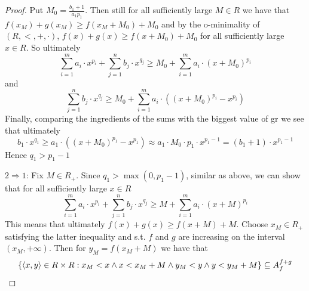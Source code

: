 \documentclass[11pt]{article}
\begin{document}
\begin{proof}
Put \(M_0=\frac{b_1+1}{a_1p_1}\). Then still for all sufficiently large \(M\in R\) we have
that \(f(x_M)+g(x_M)\ge f(x_M+M_0)+M_0\) and by the o-minimality
of \((R,<,+,\cdot)\), \(f(x)+g(x)\ge f(x+M_0)+M_0\) for all sufficiently large \(x\in R\). So ultimately
\begin{equation*}
\sum_{i=1}^ma_i\cdot x^{p_i}+\sum_{j=1}^nb_j\cdot x^{q_j}\ge M_0+\sum_{i=1}^ma_i\cdot(x+M_0)^{p_i}
\end{equation*}
and
\begin{equation*}
\sum_{j=1}^nb_j\cdot x^{q_j}\ge M_0+\sum_{i=1}^ma_i\cdot((x+M_0)^{p_i}-x^{p_i})
\end{equation*}
Finally, comparing the ingredients of the sums with the biggest value of gr we see that
ultimately
\begin{equation*}
b_1\cdot x^{q_1}\ge a_1\cdot((x+M_0)^{p_1}-x^{p_1})\approx a_1\cdot M_0\cdot p_1\cdot x^{p_1-1}=(b_1+1)\cdot x^{p_1-1}
\end{equation*}
Hence \(q_1>p_1-1\)

\(2\Rightarrow 1\): Fix \(M\in R_+\). Since \(q_1>\max(0,p_1-1)\), similar as above, we can show that for all
sufficiently large \(x\in R\)
\begin{equation*}
\sum_{i=1}^ma_i\cdot x^{p_i}+\sum_{j=1}^nb_j\cdot x^{q_j}\ge M+\sum_{i=1}^ma_i\cdot(x+M)^{p_i}
\end{equation*}
This means that ultimately \(f(x)+g(x)\ge f(x+M)+M\). Choose \(x_M\in R_+\) satisfying the latter
inequality and s.t. \(f\) and \(g\) are increasing on the interval \((x_M,+\infty)\). Then
for \(y_M=f(x_M+M)\) we have that
\begin{equation*}
\{\langle x,y\rangle\in R\times R:x_M<x\wedge x<x_M+M\wedge y_M<y\wedge y<y_M+M\}\subseteq A^{f+g}_f
\end{equation*}
\end{proof}
\end{document}
